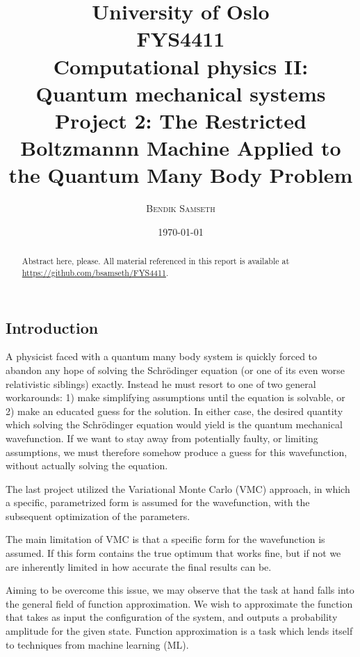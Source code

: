 \documentclass[a4paper, 11pt]{article}
\title{ \small
University of Oslo\\
FYS4411\\
Computational physics II: Quantum mechanical systems\\
\huge Project 2: The Restricted Boltzmannn Machine Applied to the Quantum Many Body Problem}
\author{\textsc{Bendik Samseth}}
\date{\today}
\begin{document}
\maketitle

\begin{abstract}
    Abstract here, please.
    All material referenced in this report is available at
    \url{https://github.com/bsamseth/FYS4411}.
\end{abstract}


\pagebreak
{}
\tableofcontents

\begin{multicols}{2}    

    \section{Introduction} 

    A physicist faced with a quantum many body system is quickly forced to
    abandon any hope of solving the Schrödinger equation (or one of its even worse
    relativistic siblings) exactly. Instead he must resort to one of two general
    workarounds: 1) make simplifying assumptions until the equation is solvable,
    or 2) make an educated guess for the solution. In either case, the desired
    quantity which solving the Schrödinger equation would yield is the quantum
    mechanical wavefunction. If we want to stay away from potentially faulty, or
    limiting assumptions, we must therefore somehow produce a guess for this
    wavefunction, without actually solving the equation.

    The last project utilized the Variational Monte Carlo (VMC) approach, in which a
    specific, parametrized form is assumed for the wavefunction, with the
    subsequent optimization of the parameters.

    The main limitation of VMC is that a specific form for the wavefunction is
    assumed. If this form contains the true optimum that works fine, but if not
    we are inherently limited in how accurate the final results can be.

    Aiming to be overcome this issue, we may observe that the task at hand falls
    into the general field of function approximation. We wish to approximate the
    function that takes as input the configuration of the system, and outputs a
    probability amplitude for the given state. Function approximation is a task
    which lends itself to techniques from machine learning (ML). 


\end{multicols}
\end{document}
